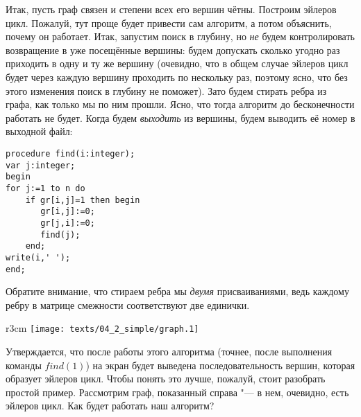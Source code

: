 Итак, пусть граф связен и степени всех его вершин чётны. Построим эйлеров цикл. Пожалуй, тут проще 
будет привести сам алгоритм, а потом объяснить, почему он работает. Итак, запустим поиск в глубину, 
но \textit{не} будем контролировать возвращение в уже посещённые вершины: будем допускать сколько 
угодно раз приходить в одну и ту же вершину (очевидно, что в общем случае эйлеров цикл будет через 
каждую вершину проходить по нескольку раз, поэтому ясно, что без этого изменения поиск в глубину не 
поможет). Зато будем стирать ребра из графа, как только мы по ним прошли. Ясно, что тогда алгоритм 
до бесконечности работать не будет. Когда будем \textit{выходить} из вершины, будем выводить её 
номер в выходной файл:
\begin{codesampleo}\begin{verbatim}
procedure find(i:integer);
var j:integer;
begin
for j:=1 to n do
    if gr[i,j]=1 then begin
       gr[i,j]:=0;
       gr[j,i]:=0;
       find(j);
    end;
write(i,' ');
end;
\end{verbatim}
\end{codesampleo}
Обратите внимание, что стираем ребра мы \textit{двумя} присваиваниями, ведь каждому ребру в матрице 
смежности соответствуют две единички.

\begin{wrapfigure}{r}{3cm}
\vspace{-0.3cm}
\texttt{[image: texts/04\_2\_simple/graph.1]}
\end{wrapfigure}
Утверждается, что после работы этого алгоритма (точнее, после выполнения команды $find(1)$)
на экран будет выведена последовательность вершин, 
которая образует эйлеров цикл. Чтобы понять это лучше, пожалуй, стоит разобрать простой пример.
Рассмотрим граф, показанный справа "--- в нем, очевидно, есть эйлеров цикл. Как будет работать наш 
алгоритм?

\vspace{0.3cm}

